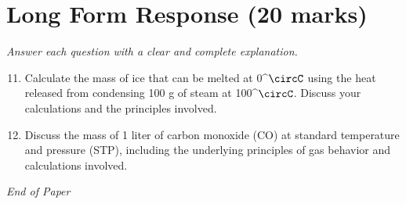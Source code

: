 \documentclass[12pt]{article}
\begin{document}
\section*{Long Form Response (20 marks)}
\textit{Answer each question with a clear and complete explanation.}
\begin{enumerate}[label=\arabic*.]
\setcounter{enumi}{10}
\item Calculate the mass of ice that can be melted at 0^\ensuremath{\circC} using the heat released from condensing 100 g of steam at 100^\ensuremath{\circC}. Discuss your calculations and the principles involved.
\item Discuss the mass of 1 liter of carbon monoxide (CO) at standard temperature and pressure (STP), including the underlying principles of gas behavior and calculations involved.
\end{enumerate}

\vfill
\noindent\textit{End of Paper}
\end{document}
